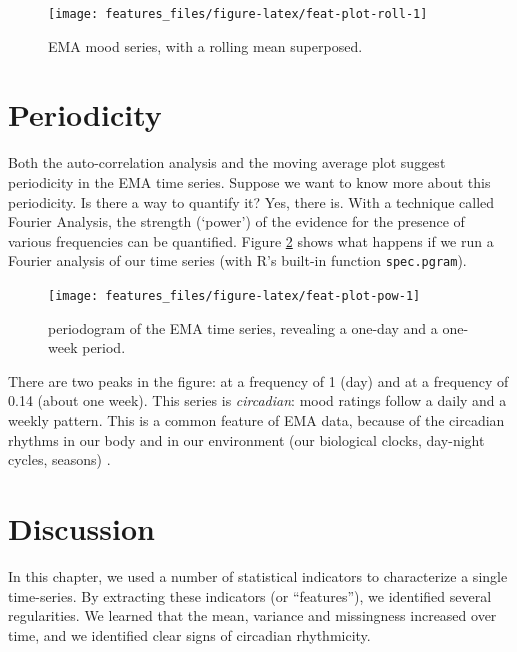 \documentclass[]{book}
\begin{document}
\begin{figure}

{\centering \texttt{[image: features\_files/figure-latex/feat-plot-roll-1]} 

}

\caption{EMA mood series, with a rolling mean superposed.}\label{fig:feat-plot-roll}
\end{figure}

\section{Periodicity}\label{periodicity}


Both the auto-correlation analysis and the moving average plot suggest
periodicity in the EMA time series. Suppose we want to know more about
this periodicity. Is there a way to quantify it? Yes, there is. With a
technique called Fourier Analysis, the strength (`power') of the
evidence for the presence of various frequencies can be quantified.
Figure \ref{fig:feat-plot-pow} shows what happens if we run a Fourier
analysis of our time series (with R's built-in function
\texttt{spec.pgram}).

\begin{figure}

{\centering \texttt{[image: features\_files/figure-latex/feat-plot-pow-1]} 

}

\caption{periodogram of the EMA time series, revealing a one-day and a one-week period.}\label{fig:feat-plot-pow}
\end{figure}

There are two peaks in the figure: at a frequency of 1 (day) and at a
frequency of 0.14 (about one week). This series is \emph{circadian}:
mood ratings follow a daily and a weekly pattern. This is a common
feature of EMA data, because of the circadian rhythms in our body and in
our environment (our biological clocks, day-night cycles, seasons)
\citep{Doherty2018, Frank2000, Frank2007, Karatsoreos2014, VanSomeren2000, Tahmasian2013}.

\section{Discussion}\label{discussion-1}

In this chapter, we used a number of statistical indicators to
characterize a single time-series. By extracting these indicators (or
``features''), we identified several regularities. We learned that the
mean, variance and missingness increased over time, and we identified
clear signs of circadian rhythmicity.
\end{document}
